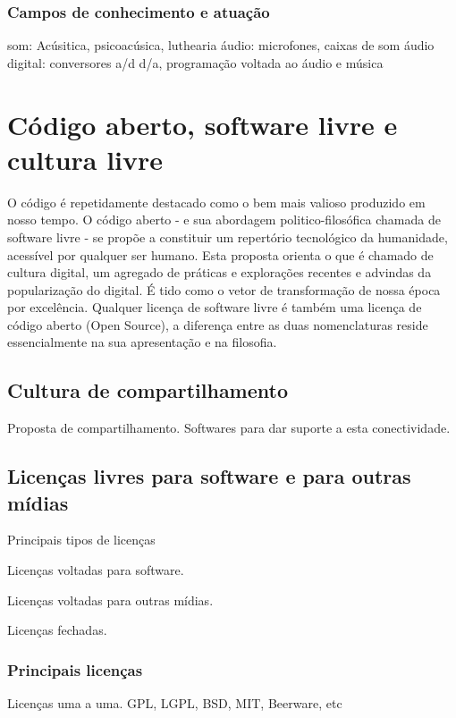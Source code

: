 	  \subsubsection{Campos de conhecimento e atuação}
	som: Acúsitica, psicoacúsica, luthearia
	áudio: microfones, caixas de som
	áudio digital: conversores a/d d/a, programação voltada ao áudio e música


  \section{Código aberto, software livre e cultura livre}
  O código é repetidamente destacado como o bem mais valioso produzido em nosso tempo.
  O código aberto - e sua abordagem politico-filosófica chamada de software livre -
  se propõe a constituir um repertório tecnológico da humanidade, acessível por
  qualquer ser humano. Esta proposta orienta o que é chamado de cultura digital,
  um agregado de práticas e explorações recentes e advindas da popularização do digital.
  É tido como o vetor de transformação de nossa época por excelência.
  Qualquer licença de software livre é também uma licença de código aberto
  (Open Source), a diferença entre as duas nomenclaturas reside essencialmente
  na sua apresentação e na filosofia.


      \subsection{Cultura de compartilhamento}
      \label{sec:soft_compar}
    Proposta de compartilhamento. Softwares para dar suporte a esta conectividade.


      \subsection{Licenças livres para software e para outras mídias}
      \label{sec:licencas_livres}
    Principais tipos de licenças

    Licenças voltadas para software.

    Licenças voltadas para outras mídias.

    Licenças fechadas.

	  \subsubsection{Principais licenças}
	  \label{sec:princ_licencas}
	Licenças uma a uma. GPL, LGPL, BSD, MIT, Beerware, etc
    
